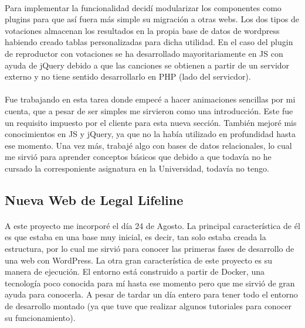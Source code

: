 \documentclass[10pt, a4paper,spanish]{article}
\begin{document}
            \paragraph{}
            Para implementar la funcionalidad decidí modularizar los componentes como plugins para que así fuera más simple su migración a otras webs. Los dos tipos de votaciones almacenan los resultados en la propia base de datos de wordpress habiendo creado tablas personalizadas para dicha utilidad. En el caso del plugin de reproductor con votaciones se ha desarrollado mayoritariamente en JS con ayuda de jQuery debido a que las canciones se obtienen a partir de un servidor externo y no tiene sentido desarrollarlo en PHP (lado del servicdor).

            \paragraph{}
            Fue trabajando en esta tarea donde empecé a hacer animaciones sencillas por mi cuenta, que a pesar de ser simples me sirvieron como una introducción. Este fue un requisito impuesto por el cliente para esta nueva sección. También mejoré mis conocimientos en JS y jQuery, ya que no la había utilizado en profundidad hasta ese momento. Una vez más, trabajé algo con bases de datos relacionales, lo cual me sirvió para aprender conceptos básicos que debido a que todavía no he cursado la corresponiente asignatura en la Universidad, todavía no tengo.


        \subsection{Nueva Web de Legal Lifeline}

            \paragraph{}
            A este proyecto me incorporé el día 24 de Agosto. La principal característica de él es que estaba en una base muy inicial, es decir, tan solo estaba creada la estructura, por lo cual me sirvió para conocer las primeras fases de desarrollo de una web con WordPress. La otra gran característica de este proyecto es su manera de ejecución. El entorno está construido a partir de Docker, una tecnología poco conocida para mí hasta ese momento pero que me sirvió de gran ayuda para conocerla. A pesar de tardar un día entero para tener todo el entorno de desarrollo montado (ya que tuve que realizar algunos tutoriales para conocer su funcionamiento).
\end{document}
